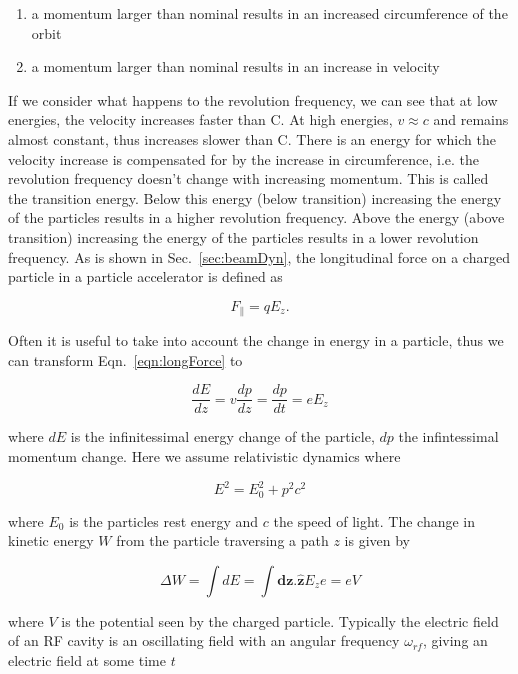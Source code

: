 \begin{enumerate}
\item{a momentum larger than nominal results in an increased circumference of the orbit}
\item{a momentum larger than nominal results in an increase in velocity}
\end{enumerate}

If we consider what happens to the revolution frequency, we can see that at low energies, the velocity increases faster than C. At high energies, $v \approx c$ and remains almost constant, thus increases slower than C. There is an energy for which the velocity increase is compensated for by the increase in circumference, i.e. the revolution frequency doesn't change with increasing momentum. This is called the transition energy. Below this energy (below transition) increasing the energy of the particles results in a higher revolution frequency. Above the energy (above transition) increasing the energy of the particles results in a lower revolution frequency.
As is shown in Sec.~\ref{sec:beamDyn}, the longitudinal force on a charged particle in a particle accelerator is defined as 

\begin{equation}
F_{\parallel} = qE_{z}.
\label{eqn:longForce}
\end{equation}

Often it is useful to take into account the change in energy in a particle, thus we can transform Eqn.~\ref{eqn:longForce} to

\begin{equation}
\frac{dE}{dz} = v\frac{dp}{dz} = \frac{dp}{dt} = eE_{z}
\end{equation}

where $dE$ is the infinitessimal energy change of the particle, $dp$ the infintessimal momentum change. Here we assume relativistic dynamics where 

\begin{equation}
E^{2} = E_{0}^{2} + p^{2}c^{2}
\end{equation}

where $E_{0}$ is the particles rest energy and $c$ the speed of light. The change in kinetic energy $W$ from the particle traversing a path $z$ is given by

\begin{equation}
\Delta W = \int dE = \int \mathbf{dz}.\mathbf{\hat{z}} E_{z} e = eV
\end{equation}

where $V$ is the potential seen by the charged particle. Typically the electric field of an RF cavity is an oscillating field with an angular frequency $\omega_{rf}$, giving an electric field at some time $t$

